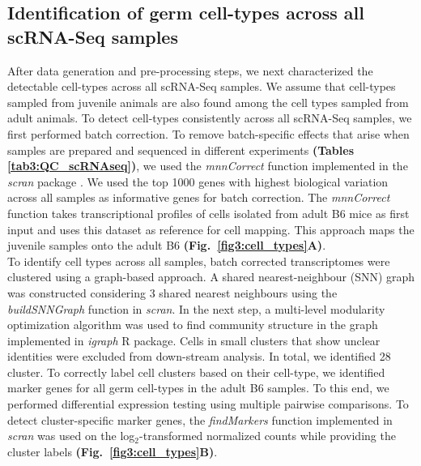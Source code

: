 \newpage

\subsection{Identification of germ cell-types across all scRNA-Seq samples}

After data generation and pre-processing steps, we next characterized the detectable cell-types across all scRNA-Seq samples. We assume that cell-types sampled from juvenile animals are also found among the cell types sampled from adult animals. To detect cell-types consistently across all scRNA-Seq samples, we first performed batch correction. To remove batch-specific effects that arise when samples are prepared and sequenced in different experiments \textbf{(Tables \ref{tab3:QC_scRNAseq})}, we used the \emph{mnnCorrect} function implemented in the \emph{scran} package \citep{Haghverdi2018}. We used the top 1000 genes with highest biological variation across all samples as informative genes for batch correction. The \emph{mnnCorrect} function takes transcriptional profiles of cells isolated from adult B6 mice as first input and uses this dataset as reference for cell mapping. This approach maps the juvenile samples onto the adult B6 \textbf{(Fig.~\ref{fig3:cell_types}A)}.\\

To identify cell types across all samples, batch corrected transcriptomes were clustered using a graph-based approach. A shared nearest-neighbour (SNN) graph \citep{Xu2015} was constructed considering 3 shared nearest neighbours using the \emph{buildSNNGraph} function in \emph{scran}. In the next step, a multi-level modularity optimization algorithm was used to find community structure in the graph \citep{Blondel2008} implemented in \emph{igraph} R package. Cells in small clusters that show unclear identities were excluded from down-stream analysis. In total, we identified 28 cluster. To correctly label cell clusters based on their cell-type, we identified marker genes for all germ cell-types in the adult B6 samples. To this end, we performed differential expression testing using multiple pairwise comparisons. To detect cluster-specific marker genes, the \emph{findMarkers} function implemented in \emph{scran} was used on the log$_2$-transformed normalized counts while providing the cluster labels \textbf{(Fig.~\ref{fig3:cell_types}B)}. \\

